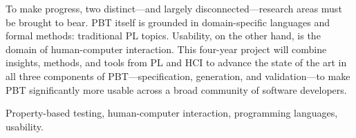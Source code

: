 

To make progress, two distinct---and largely disconnected---research areas
must be brought to bear.  PBT itself is grounded in domain-specific
languages and formal methods: traditional PL topics.  Usability, on
the other hand, is the domain of human-computer interaction.
%
This four-year project will combine insights, methods, and tools from
PL and HCI to advance the state of the art in all three components of
PBT---specification, generation, and validation---to make PBT
significantly more usable across a broad community of software developers.

\smallskip

 Property-based testing, human-computer
interaction, programming languages, usability.

